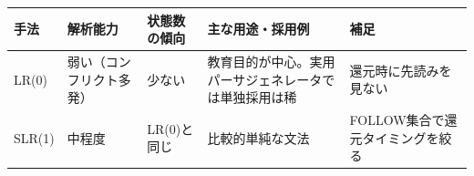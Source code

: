 \begin{longtable}[]{@{}lllll@{}}
\toprule
\begin{minipage}[b]{0.17\columnwidth}\raggedright
手法\strut
\end{minipage} & \begin{minipage}[b]{0.17\columnwidth}\raggedright
解析能力\strut
\end{minipage} & \begin{minipage}[b]{0.17\columnwidth}\raggedright
状態数の傾向\strut
\end{minipage} & \begin{minipage}[b]{0.17\columnwidth}\raggedright
主な用途・採用例\strut
\end{minipage} & \begin{minipage}[b]{0.17\columnwidth}\raggedright
補足\strut
\end{minipage}\tabularnewline
\midrule
\endhead
\begin{minipage}[t]{0.17\columnwidth}\raggedright
LR(0)\strut
\end{minipage} & \begin{minipage}[t]{0.17\columnwidth}\raggedright
弱い（コンフリクト多発）\strut
\end{minipage} & \begin{minipage}[t]{0.17\columnwidth}\raggedright
少ない\strut
\end{minipage} & \begin{minipage}[t]{0.17\columnwidth}\raggedright
教育目的が中心。実用パーサジェネレータでは単独採用は稀\strut
\end{minipage} & \begin{minipage}[t]{0.17\columnwidth}\raggedright
還元時に先読みを見ない\strut
\end{minipage}\tabularnewline
\begin{minipage}[t]{0.17\columnwidth}\raggedright
SLR(1)\strut
\end{minipage} & \begin{minipage}[t]{0.17\columnwidth}\raggedright
中程度\strut
\end{minipage} & \begin{minipage}[t]{0.17\columnwidth}\raggedright
LR(0)と同じ\strut
\end{minipage} & \begin{minipage}[t]{0.17\columnwidth}\raggedright
比較的単純な文法\strut
\end{minipage} & \begin{minipage}[t]{0.17\columnwidth}\raggedright
FOLLOW集合で還元タイミングを絞る\strut

\end{minipage}
\end{longtable}
